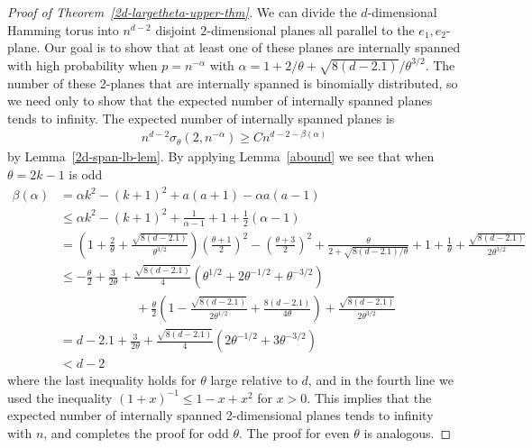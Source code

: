 \documentclass{amsart}
\newcommand{\threshold}{\theta}
\numberwithin{equation}{section}
\theoremstyle{definition}
\theoremstyle{remark}
\begin{document}
\begin{proof}[Proof of Theorem~\ref{2d-largetheta-upper-thm}]
We can divide the $d$-dimensional Hamming torus into $n^{d-2}$ disjoint $2$-dimensional planes all parallel to the $e_1,e_2$-plane.  Our goal is to show that at least one of these planes are internally spanned with high probability when $p=n^{-\alpha}$ with $\alpha = 1+2/\theta + \sqrt{8(d-2.1)}/\theta^{3/2}$.  The number of these 2-planes that are internally spanned is binomially distributed, so we need only to show that the expected number of internally spanned planes tends to infinity.  The expected number of internally spanned planes is
\begin{align*}
n^{d-2} \sigma_\theta(2,n^{-\alpha}) \geq C n^{d-2 - \beta(\alpha)}
\end{align*}
by Lemma~\ref{2d-span-lb-lem}.  By applying Lemma~\ref{abound} we see that when $\theta=2k-1$ is odd
\begin{align*}
\beta(\alpha) &= \alpha k^2 - (k+1)^2+a(a+1) - \alpha a(a-1)  \\
&\leq \alpha k^2 - (k+1)^2+ \frac{1}{\alpha - 1} + 1 + \frac{1}{2}(\alpha -1)  \\
&= \left(1 + \frac{2}{\threshold}+\frac{\sqrt{8(d-2.1)}}{\threshold^{3/2}} \right)\left(\frac{\threshold+1}{2}\right)^2 - \left(\frac{\threshold+3}{2} \right)^2  + \frac{\threshold}{2 + \sqrt{8(d-2.1)/\threshold}} + 1+ \frac{1}{\threshold}+\frac{\sqrt{8(d-2.1)}}{2\threshold^{3/2}} \\
&\leq -\frac{\threshold}{2}+\frac{3}{2\threshold}+\frac{\sqrt{8(d-2.1)}}{4}(\threshold^{1/2} + 2\threshold^{-1/2} + \threshold^{-3/2}) \\&\qquad\qquad\qquad+ \frac{\threshold}{2} \left(1- \frac{\sqrt{8(d-2.1)}}{2\threshold^{1/2}}+\frac{8(d-2.1)}{4\threshold}\right) +\frac{\sqrt{8(d-2.1)}}{2\threshold^{3/2}} \\
& = d-2.1 + \frac{3}{2\threshold}+\frac{\sqrt{8(d-2.1)}}{4}(2\threshold^{-1/2} + 3\threshold^{-3/2})\\
& < d-2
\end{align*}
where the last inequality holds for $\theta$ large relative to $d$, and in the fourth line we used the inequality $(1+x)^{-1} \leq 1- x+x^2$ for $x>0$.  This implies that the expected number of internally spanned 2-dimensional planes tends to infinity with $n$, and completes the proof for odd $\theta$.  The proof for even $\theta$ is analogous.
\end{proof}
\end{document}
